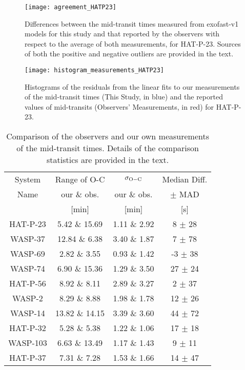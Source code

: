 \documentclass[a4paper,fleqn,usenatbib]{mnras}
\begin{document}
\begin{figure}
\texttt{[image: agreement\_HATP23]}
\caption{Differences between the mid-transit times measured from {\sc exofast}-v1 models for this study and that reported by the observers with respect to the average of both measurements, for HAT-P-23. Sources of both the positive and negative outliers are provided in the text.}
    \label{fig:agreement_HATP23}
\end{figure}

\begin{figure}
\texttt{[image: histogram\_measurements\_HATP23]}
\caption{Histograms of the residuals from the linear fits to our measurements of the mid-transit times (This Study, in blue) and the reported values of mid-transits (Observers' Measurements, in red) for HAT-P-23.}
    \label{fig:histogram_measurements_HATP23}
\end{figure}


\begin{table}
  \footnotesize
	\centering
	\caption{Comparison of the observers and our own measurements of the mid-transit times. Details of the comparison statistics are provided in the text.}
	\label{tab:comparison_statistics}
	\begin{tabular}{cccc} %
		\hline
		System & Range of O-C & $\sigma_{\rm O-C}$ & Median Diff. \\
                Name & our \& obs. & our \& obs. & $\pm$ MAD  \\
                 & [min] & [min] & [s]  \\ 
		\hline
		HAT-P-23 & 5.42 \& 15.69 & 1.11 \& 2.92 & 8 $\pm$ 28  \\
                WASP-37 & 12.84 \& 6.38 & 3.40 \& 1.87 & 7 $\pm$ 78  \\
                WASP-69 & 2.82 \& 3.55 & 0.93 \& 1.42 & -3 $\pm$ 38 \\
                WASP-74 & 6.90 \& 15.36 & 1.29 \& 3.50 & 27 $\pm$ 24  \\
                HAT-P-56 & 8.92 \& 8.11 &  2.89 \& 3.27  & 2 $\pm$ 37 \\
                WASP-2 & 8.29 \& 8.88 &  1.98 \& 1.78  & 12 $\pm$ 26  \\
                WASP-14 & 13.82 \& 14.15 &  3.39 \& 3.60   & 44 $\pm$ 72 \\
                HAT-P-32 & 5.28 \& 5.38 &  1.22 \& 1.06 & 17 $\pm$ 18 \\
                WASP-103 & 6.63 \& 13.49 &  1.17 \& 1.43 & 9 $\pm$ 11 \\
                HAT-P-37 & 7.31 \& 7.28 &  1.53 \& 1.66 & 14 $\pm$ 47 \\  
                \hline
	\end{tabular}
\end{table}
\end{document}
